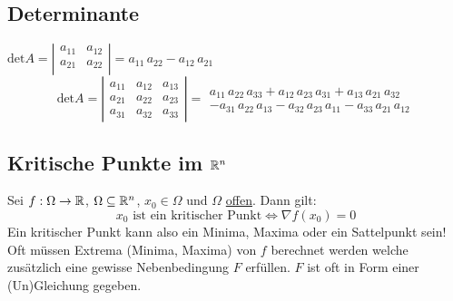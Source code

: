 \subsection{Determinante}
{\small
$
	\text{det} A = 
	\left|
		\begin{array}{cc}
			a_{11} & a_{12}\\
			a_{21} & a_{22}\\
		\end{array}
	\right| = a_{11} \, a_{22} - a_{12} \, a_{21}
$
\[
	\text{det} A = 
	\left|
		\begin{array}{ccc}
			a_{11} & a_{12} & a_{13}\\
			a_{21} & a_{22} & a_{23}\\
			a_{31} & a_{32} & a_{33}
		\end{array}
	\right| = 
	\begin{array}{c}
			a_{11} \, a_{22} \, a_{33} + a_{12} \, a_{23} \, a_{31} + a_{13} \, a_{21} \, a_{32}\\
			- a_{31} \, a_{22} \, a_{13} - a_{32} \, a_{23} \, a_{11} - a_{33} \, a_{21} \, a_{12}
	\end{array}
\]}

\subsection{Kritische Punkte im $\mathbb{R}^n$}
Sei $f: \Omega \to \mathbb{R}$, $\Omega \subseteq \mathbb{R}^n$,  $x_0 \in \Omega$ und $\Omega$ \uline{offen}. Dann gilt: 
\[
	x_0 \text{ ist ein kritischer Punkt} \Leftrightarrow \nabla f(x_0) = 0
\]
Ein kritischer Punkt kann also ein Minima, Maxima oder ein Sattelpunkt sein! Oft müssen Extrema (Minima, Maxima) von $f$ berechnet werden welche zusätzlich eine gewisse Nebenbedingung $F$ erfüllen. $F$ ist oft in Form einer (Un)Gleichung 
gegeben. 

